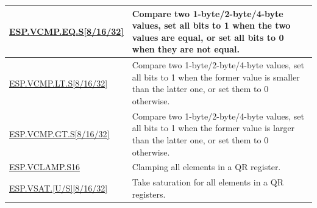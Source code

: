 \begin{longtable}[c]{|l|m{11cm}|}
    \hyperref[instruction:ESPVCMPEQS8]{ESP.VCMP.EQ.S[8/16/32]} & Compare two 1-byte/2-byte/4-byte values, set all bits to 1 when the two values are equal, or set all bits to 0 when they are not equal.
    \\\hline
    \hyperref[instruction:ESPVCMPLTS8]{ESP.VCMP.LT.S[8/16/32]} & Compare two 1-byte/2-byte/4-byte values, set all bits to 1 when the former value is smaller than the latter one, or set them to 0 otherwise.
    \\\hline
    \hyperref[instruction:ESPVCMPGTS8]{ESP.VCMP.GT.S[8/16/32]} & Compare two 1-byte/2-byte/4-byte values, set all bits to 1 when the former value is larger than the latter one, or set them to 0 otherwise.
    \\\hline
    \hyperref[instruction:ESPVCLAMPS16]{ESP.VCLAMP.S16} & Clamping all elements in a QR register.
    \\\hline
    \hyperref[instruction:ESPVSATU8]{ESP.VSAT.[U/S][8/16/32]} & Take saturation for all elements in a QR registers.
    \\\hline
\end{longtable}
